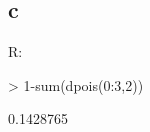 \subsection{c}

R:
\begin{Schunk}
\begin{Sinput}
> 1-sum(dpois(0:3,2))
\end{Sinput}
\begin{Soutput}
[1] 0.1428765
\end{Soutput}
\end{Schunk}
